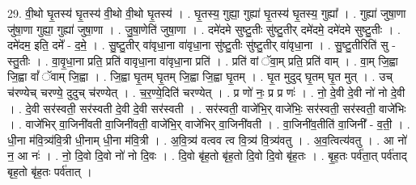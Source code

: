\documentclass[17pt]{extarticle}
\begin{document}
29. वी॒थो घृ॒तस्य॑ घृ॒तस्य॑ वी॒थो वी॒थो घृ॒तस्य॑ । . घृ॒तस्य॒ गुह्या॒ गुह्या॑ घृ॒तस्य॑ घृ॒तस्य॒ गुह्या᳚ । . गुह्या॑ जुषा॒णा जु॑षा॒णा गुह्या॒ गुह्या॑ जुषा॒णा । . जु॒षा॒णेति॑ जुषा॒णा । . दमे॑दमे सुष्टु॒तीः सु॑ष्टु॒तीर् दमे॑दमे॒ दमे॑दमे सुष्टु॒तीः । . दमे॑दम॒ इति॒ दमे᳚ - द॒मे॒ । . सु॒ष्टु॒तीर् वा॑वृधा॒ना वा॑वृधा॒ना सु॑ष्टु॒तीः सु॑ष्टु॒तीर् वा॑वृधा॒ना । . सु॒ष्टु॒तीरिति॑ सु - स्तु॒तीः । . वा॒वृ॒धा॒ना प्रति॒ प्रति॑ वावृधा॒ना वा॑वृधा॒ना प्रति॑ । . प्रति॑ वां ॅवा॒म् प्रति॒ प्रति॑ वाम् । . वा॒म् जि॒ह्वा जि॒ह्वा वां᳚ ॅवाम् जि॒ह्वा । . जि॒ह्वा घृ॒तम् घृ॒तम् जि॒ह्वा जि॒ह्वा घृ॒तम् । . घृ॒त मुदुद् घृ॒तम् घृ॒त मुत् । . उच् च॑रण्येच् चरण्ये॒ दुदुच् च॑रण्येत् । . च॒र॒ण्ये॒दिति॑ चरण्येत् । . प्र णो॑ नः॒ प्र प्र णः॑ । . नो॒ दे॒वी दे॒वी नो॑ नो दे॒वी । . दे॒वी सर॑स्वती॒ सर॑स्वती दे॒वी दे॒वी सर॑स्वती । . सर॑स्वती॒ वाजे॑भि॒र् वाजे॑भिः॒ सर॑स्वती॒ सर॑स्वती॒ वाजे॑भिः । . वाजे॑भिर् वा॒जिनी॑वती वा॒जिनी॑वती॒ वाजे॑भि॒र् वाजे॑भिर् वा॒जिनी॑वती । . वा॒जिनी॑व॒तीति॑ वा॒जिनी᳚ - व॒ती॒ । . धी॒ना म॑वि॒त्र्य॑वि॒त्री धी॒नाम् धी॒ना म॑वि॒त्री । . अ॒वि॒त्र्य॑ वत्वव त्व वि॒त्र्य॑ वि॒त्र्य॑वतु । . अ॒व॒त्वित्य॑वतु । . आ नो॑ न॒ आ नः॑ । . नो॒ दि॒वो दि॒वो नो॑ नो दि॒वः । . दि॒वो बृ॑ह॒तो बृ॑ह॒तो दि॒वो दि॒वो बृ॑ह॒तः । . बृ॒ह॒तः पर्व॑ता॒त् पर्व॑ताद् बृह॒तो बृ॑ह॒तः पर्व॑तात् । \newline
\end{document}
